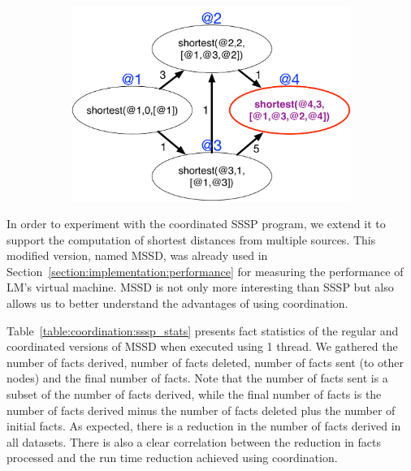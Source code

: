 \begin{figure}
\begin{center}
\begin{subfigure}[b]{0.49\textwidth}
      \mycap{}
   \end{subfigure}
   \begin{subfigure}[b]{0.49\textwidth}
      \includegraphics[width=\textwidth]{figures/sssp/coord4}
      \mycap{}
   \end{subfigure}
\end{center}
\label{fig:coordination:new_sssp}
\end{figure}

In order to experiment with the coordinated SSSP program, we extend it to
support the computation of shortest distances from multiple sources. This
modified version, named MSSD, was already used in
Section~\ref{section:implementation:performance} for measuring the performance
of LM's virtual machine. MSSD is not only more interesting than SSSP but also
allows us to better understand the advantages of using coordination.

Table~\ref{table:coordination:sssp_stats} presents fact statistics of the
regular and coordinated versions of MSSD when executed using 1 thread. We
gathered the number of facts derived, number of facts deleted, number of facts
sent (to other nodes) and the final number of facts. Note that the number of
facts sent is a subset of the number of facts derived, while the final number of
facts is the number of facts derived minus the number of facts deleted plus the
number of initial facts. As expected, there is a reduction in the number of
facts derived in all datasets. There is also a clear correlation between the
reduction in facts processed and the run time reduction achieved using
coordination.

